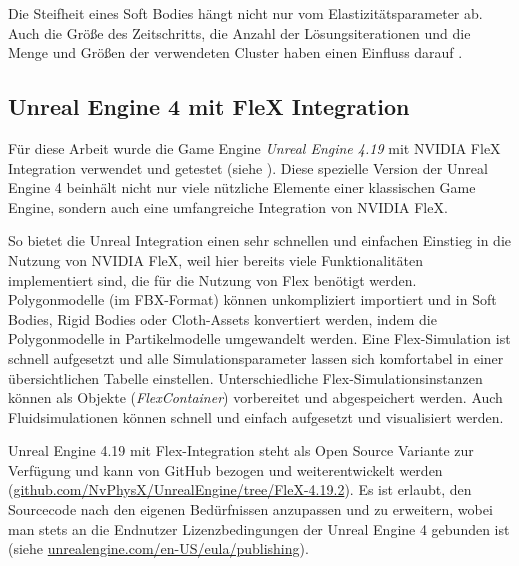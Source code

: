 Die Steifheit eines Soft Bodies hängt nicht nur vom Elastizitätsparameter ab. Auch die Größe des Zeitschritts, die Anzahl der Lösungsiterationen und die Menge und Größen der verwendeten Cluster haben einen Einfluss darauf \cite{PBDKidney}.

\clearpage
{}



\subsection{Unreal Engine 4 mit FleX Integration}

Für diese Arbeit wurde die Game Engine \textit{Unreal Engine 4.19} mit NVIDIA FleX Integration verwendet und getestet (siehe \cite{UE4FlexDoc}). Diese spezielle Version der Unreal Engine 4 beinhält nicht nur viele nützliche Elemente einer klassischen Game Engine, sondern auch eine umfangreiche Integration von NVIDIA FleX. 

So bietet die Unreal Integration einen sehr schnellen und einfachen Einstieg in die Nutzung von NVIDIA FleX, weil hier bereits viele Funktionalitäten implementiert sind, die für die Nutzung von Flex benötigt werden. Polygonmodelle (im FBX-Format) können unkompliziert importiert und in Soft Bodies, Rigid Bodies oder Cloth-Assets konvertiert werden, indem die Polygonmodelle in Partikelmodelle umgewandelt werden. Eine Flex-Simulation ist schnell aufgesetzt und alle  \linebreak Simulationsparameter lassen sich komfortabel in einer übersichtlichen Tabelle einstellen. Unterschiedliche Flex-Simulationsinstanzen können als Objekte  \linebreak (\textit{FlexContainer}) vorbereitet und abgespeichert werden. Auch Fluidsimulationen können schnell und einfach aufgesetzt und visualisiert werden.

Unreal Engine 4.19 mit Flex-Integration steht als Open Source Variante zur Verfügung und kann von GitHub bezogen und weiterentwickelt werden (\url{github.com/NvPhysX/UnrealEngine/tree/FleX-4.19.2}). 
Es ist erlaubt, den Sourcecode nach den eigenen Bedürfnissen anzupassen und zu erweitern, wobei man stets an die Endnutzer Lizenzbedingungen der Unreal Engine 4 gebunden ist (siehe \url{unrealengine.com/en-US/eula/publishing}).

